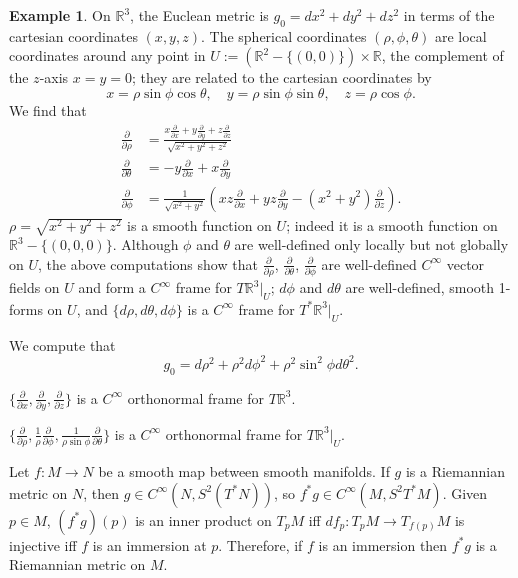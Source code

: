 \documentclass{amsart}
\numberwithin{equation}{section}
\newcommand{\bR}{\mathbb{R}}
\theoremstyle{definition}
\newtheorem{example}[definition]{Example}
\theoremstyle{theorem}
\begin{document}
\begin{example}
On $\bR^3$, the Euclean metric is $g_0 = dx^2 + dy^2 + dz^2$ in terms of
the cartesian coordinates $(x,y,z)$. The spherical coordinates $(\rho,\phi,\theta)$
are local coordinates around any point in $U:= (\bR^2-\{(0,0)\})\times \bR$, 
the complement of the $z$-axis $x=y=0$; they are related to
the cartesian coordinates by 
$$
x = \rho \sin \phi \cos \theta,\quad
y = \rho \sin \phi \sin \theta,\quad
z = \rho \cos \phi.
$$
We find that 
\begin{align*}
\frac{\partial}{\partial \rho} &= \frac{x \frac{\partial}{\partial x} + y \frac{\partial}{\partial y} + z \frac{\partial}{\partial z}}{\sqrt{x^2 + y^2 + z^2}} \\
\frac{\partial}{\partial \theta} &= -y \frac{\partial}{\partial x} + x \frac{\partial}{\partial y} \\
\frac{\partial}{\partial \phi} &= \frac{1}{\sqrt{x^2 + y^2}}\left(xz \frac{\partial}{\partial x} + yz \frac{\partial}{\partial y} - (x^2 + y^2) \frac{\partial}{\partial z}\right).
\end{align*}
$\rho=\sqrt{x^2+y^2+z^2}$ is a smooth function on $U$; indeed it is a smooth function on $\bR^3-\{(0,0,0)\}$.
Although $\phi$ and $\theta$ are well-defined only locally but not globally on $U$, the above
computations show that $\frac{\partial}{\partial \rho}$, $\frac{\partial}{\partial \theta}$, 
$\frac{\partial}{\partial \phi}$ are well-defined $C^\infty$ vector fields on $U$ 
and form a $C^\infty$ frame for $T\bR^3|_U$; $d\phi$ and $d\theta$ are well-defined, smooth 1-forms on $U$, and
$\{ d\rho, d\theta, d\phi\}$ is a $C^\infty$ frame for $T^*\bR^3|_U$.

We compute that  
\[
g_0 = d\rho^2 + \rho^2 d\phi^2 + \rho^2 \sin^2\phi d\theta^2.
\]

$\{\frac{\partial}{\partial x}, \frac{\partial}{\partial y}, \frac{\partial}{\partial z} \}$
is a $C^\infty$ orthonormal frame for $T\bR^3$.

$\{ \frac{\partial}{\partial \rho}, \frac{1}{\rho}\frac{\partial}{\partial \phi}, 
\frac{1}{\rho \sin\phi} \frac{\partial}{\partial \theta}\}$
is a $C^\infty$ orthonormal frame for $T\bR^3|_U$. 
\end{example}

\bigskip

Let $f : M \to N$ be a smooth map between smooth manifolds. If $g$ is
a Riemannian metric on $N$, then $g\in C^\infty(N, S^2(T^*N))$, so 
$f^*g\in C^\infty(M,S^2T^*M)$.  Given $p\in M$, 
$(f^*g)(p)$ is an inner product on $T_p M$ iff $df_p: T_pM\to T_{f(p)}M$
is injective iff $f$ is an immersion at $p$. Therefore, if $f$ is an immersion
then $f^*g$ is a Riemannian metric on $M$.
\end{document}
